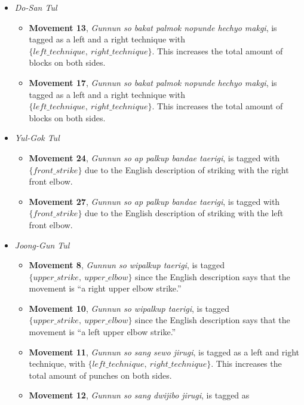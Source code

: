 \documentclass[10pt,twocolumn,a4paper]{article}
\begin{document}
\begin{itemize}
  \item
    \emph{Do-San Tul}
    \begin{itemize}
      \item
        {\bf Movement 13}, \emph{Gunnun so bakat palmok nopunde hechyo makgi},
        is tagged as a left and a right technique with $\{left\_technique, \:
        right\_technique\}$. This increases the total amount of blocks on both
        sides.
       \item
        {\bf Movement 17}, \emph{Gunnun so bakat palmok nopunde hechyo makgi},
        is tagged as a left and a right technique with $\{left\_technique, \:
        right\_technique\}$. This increases the total amount of blocks on both
        sides.
    \end{itemize}
  \item
    \emph{Yul-Gok Tul}
    \begin{itemize}
      \item
        {\bf Movement 24}, \emph{Gunnun so ap palkup bandae taerigi}, is
        tagged with $\{front\_strike\}$ due to the English description of
        striking with the right front elbow.
      \item
        {\bf Movement 27}, \emph{Gunnun so ap palkup bandae taerigi}, is
        tagged with $\{front\_strike\}$ due to the English description of
        striking with the left front elbow.
    \end{itemize}
  \item
    \emph{Joong-Gun Tul}
    \begin{itemize}
      \item
        {\bf Movement 8}, \emph{Gunnun so wipalkup taerigi}, is tagged
        $\{upper\_strike, \: upper\_elbow\}$ since the English description
        says that the movement is ``a right upper elbow strike.''
      \item
        {\bf Movement 10}, \emph{Gunnun so wipalkup taerigi}, is tagged
        $\{upper\_strike, \: upper\_elbow\}$ since the English description
        says that the movement is ``a left upper elbow strike.''
      \item
        {\bf Movement 11}, \emph{Gunnun so sang sewo jirugi}, is tagged as a
        left and right technique, with $\{left\_technique, \:
        right\_technique\}$. This increases the total amount of punches on
        both sides.
      \item
        {\bf Movement 12}, \emph{Gunnun so sang dwijibo jirugi}, is tagged as

\end{itemize}
\end{itemize}
\end{document}
